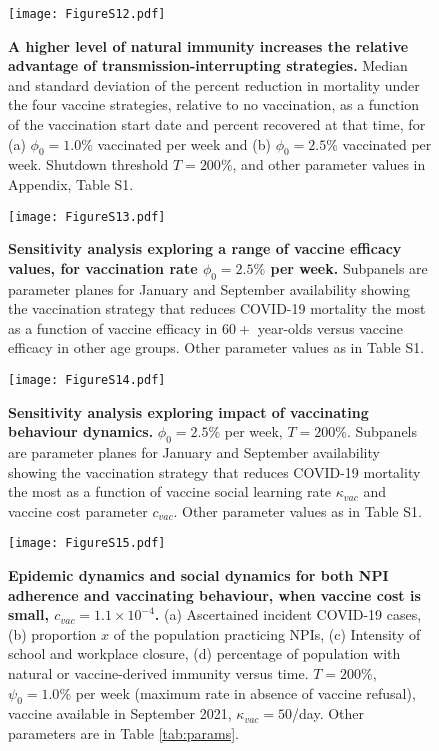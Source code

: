 \documentclass[10pt,onecolumn,twoside,lineno]{pnas-new}
\begin{document}
\clearpage 


\begin{figure}[H]
\centering
\texttt{[image: FigureS12.pdf]}
\caption{\textbf{A higher level of natural immunity increases the relative advantage of transmission-interrupting strategies.}  Median and standard deviation of the percent reduction in mortality under the four vaccine strategies, relative to no vaccination, as a function of the vaccination start date and percent recovered at that time, for (a) $\phi_0=1.0 \%$ vaccinated per week and (b) $\phi_0=2.5 \%$ vaccinated per week.  Shutdown threshold $T=200 \%$,  and other parameter values in Appendix, Table S1.}
\label{plot_model}
\end{figure}

\clearpage 

\begin{figure}[H]
\centering
\texttt{[image: FigureS13.pdf]}
\caption{\textbf{Sensitivity analysis exploring a range of vaccine efficacy values, for vaccination rate $\phi_0=2.5 \%$ per week.} Subpanels are parameter planes for January and September availability showing the vaccination strategy that reduces COVID-19 mortality the most as a function of vaccine efficacy in $60+$ year-olds versus vaccine efficacy in other age groups. Other parameter values as in Table S1.}
\label{plot_model}
\end{figure}

\clearpage 

\begin{figure}[H]
\centering
\texttt{[image: FigureS14.pdf]}
\caption{\textbf{Sensitivity analysis exploring impact of vaccinating behaviour dynamics.} $\phi_0 = 2.5 \%$ per week, $T=200 \%$. Subpanels are parameter planes for January and September availability showing the vaccination strategy that reduces COVID-19 mortality the most as a function of vaccine social learning rate $\kappa_{vac}$ and vaccine cost parameter $c_{vac}$. Other parameter values as in Table S1.}
\label{plot_model}
\end{figure}

\clearpage 

\begin{figure}[H]
\centering
\texttt{[image: FigureS15.pdf]}
\caption{\textbf{Epidemic dynamics and social dynamics for both NPI adherence and vaccinating behaviour, when vaccine cost is small, $c_{vac}=1.1\times 10^{-4}$.} (a) Ascertained incident COVID-19 cases, (b) proportion $x$ of the population practicing NPIs, (c) Intensity of school and workplace closure, (d) percentage of population with natural or vaccine-derived immunity versus time. $T=200 \%$, $\psi_0=1.0 \%$ per week (maximum rate in absence of vaccine refusal), vaccine available in September 2021, $\kappa_{vac}=50$/day.   Other parameters are in Table \ref{tab:params}.}
\label{plot_model}
\end{figure}
\end{document}
